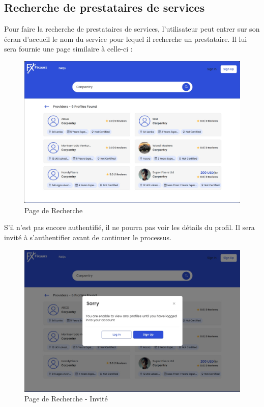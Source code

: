 {\subsection{Recherche de prestataires de services}

Pour faire la recherche de prestataires de services, l'utilisateur peut entrer sur son écran d'accueil le nom du service pour lequel il recherche un prestataire. Il lui sera fournie une page similaire à celle-ci  :

\vspace{0.35cm}
\begin{figure}[H]
\begin{center}
\includegraphics[width=12cm]{assets/demo/search-1.png}
\end{center}
\caption{Page de Recherche}
\end{figure}

S'il n'est pas encore authentifié, il ne pourra pas voir les détails du profil. Il sera invité à s'authentifier avant de continuer le processus.

\vspace{0.35cm}
\begin{figure}[H]
\begin{center}
\includegraphics[width=12cm]{assets/demo/search-2.png}
\end{center}
\caption{Page de Recherche - Invité}
\end{figure}

}

